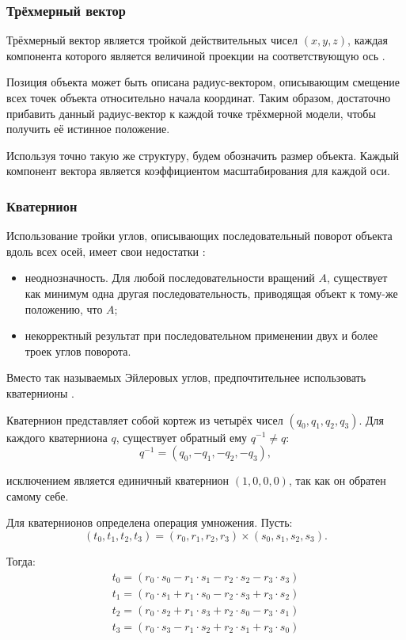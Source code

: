 \subsubsection{Трёхмерный вектор}
Трёхмерный вектор является тройкой действительных чисел $(x, y, z)$, каждая компонента которого является величиной проекции на соответствующую ось \cite{bib:vector}.

Позиция объекта может быть описана радиус-вектором, описывающим смещение всех точек объекта относительно начала координат. Таким образом, достаточно прибавить данный радиус-вектор к каждой точке трёхмерной модели, чтобы получить её истинное положение.

Используя точно такую же структуру, будем обозначить размер объекта. Каждый компонент вектора является коэффициентом масштабирования для каждой оси.

\subsubsection{Кватернион}
Использование тройки углов, описывающих последовательный поворот объекта вдоль всех осей, имеет свои недостатки \cite{bib:euler_problems}:
\begin{itemize}
	\item неоднозначность. Для любой последовательности вращений $A$, существует как минимум одна другая последовательность, приводящая объект к тому-же положению, что $A$;
	\item некорректный результат при последовательном применении двух и более троек углов поворота.
\end{itemize}

Вместо так называемых Эйлеровых углов, предпочтительнее использовать кватернионы \cite{bib:quaternions}.

Кватернион представляет собой кортеж из четырёх чисел $(q_0, q_1, q_2, q_3)$. Для каждого кватерниона $q$, существует обратный ему $q^{-1}\ne q$:
\begin{equation}
	q^{-1}=(q_0, -q_1, -q_2, -q_3),
\end{equation}

исключением является единичный кватернион $(1, 0, 0, 0)$, так как он обратен самому себе.

Для кватернионов определена операция умножения. Пусть:
\begin{equation}
	(t_0, t_1, t_2, t_3) = (r_0, r_1, r_2, r_3)\times(s_0, s_1, s_2, s_3).
\end{equation}

Тогда:
\begin{subequations}
	\begin{align}
		t_0=(r_0\cdot s_0-r_1\cdot s_1-r_2\cdot s_2-r_3\cdot s_3) \\
		t_1=(r_0\cdot s_1+r_1\cdot s_0-r_2\cdot s_3+r_3\cdot s_2) \\
		t_2=(r_0\cdot s_2+r_1\cdot s_3+r_2\cdot s_0-r_3\cdot s_1) \\
		t_3=(r_0\cdot s_3-r_1\cdot s_2+r_2\cdot s_1+r_3\cdot s_0)
	\end{align}
\end{subequations}

